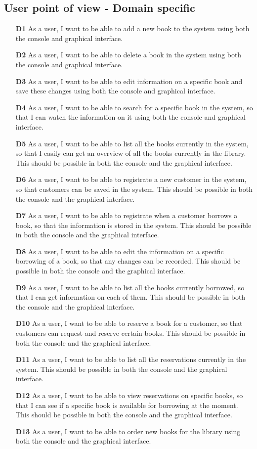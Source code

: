 \subsection*{User point of view - Domain specific}
\begin{itemize}
  \item [\textbf{D1}] As a user, I want to be able to add a new book to the system using both the console and graphical interface.
  \item [\textbf{D2}] As a user, I want to be able to delete a book in the system using both the console and graphical interface.
  \item [\textbf{D3}] As a user, I want to be able to edit information on a specific book and save these changes using both the console and graphical interface.
  \item [\textbf{D4}] As a user, I want to be able to search for a specific book in the system, so that I can watch the information on it using both the console and graphical interface.
  \item [\textbf{D5}] As a user, I want to be able to list all the books currently in the system, so that I easily can get an overview of all the books currently in the library. This should be possible in both the console and the graphical interface.
  \item [\textbf{D6}] As a user, I want to be able to registrate a new customer in the system, so that customers can be saved in the system. This should be possible in both the console and the graphical interface.
  \item [\textbf{D7}] As a user, I want to be able to registrate when a customer borrows a book, so that the information is stored in the system. This should be possible in both the console and the graphical interface.
  \item [\textbf{D8}] As a user, I want to be able to edit the information on a specific borrowing of a book, so that any changes can be recorded. This should be possible in both the console and the graphical interface.
  \item [\textbf{D9}] As a user, I want to be able to list all the books currently borrowed, so that I can get information on each of them. This should be possible in both the console and the graphical interface.
  \item [\textbf{D10}] As a user, I want to be able to reserve a book for a customer, so that customers can request and reserve certain books. This should be possible in both the console and the graphical interface.
  \item [\textbf{D11}] As a user, I want to be able to list all the reservations currently in the system. This should be possible in both the console and the graphical interface.
  \item [\textbf{D12}] As a user, I want to be able to view reservations on specific books, so that I can see if a specific book is available for borrowing at the moment. This should be possible in both the console and the graphical interface.
  \item [\textbf{D13}] As a user, I want to be able to order new books for the library using both the console and the graphical interface.
\end{itemize}
